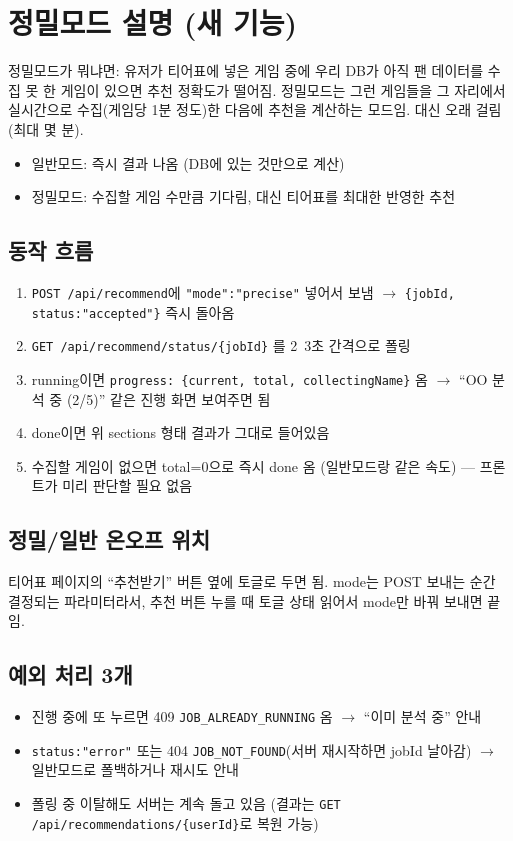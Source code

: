 \documentclass[11pt]{article}
\begin{document}
\section*{정밀모드 설명 (새 기능)}

정밀모드가 뭐냐면: 유저가 티어표에 넣은 게임 중에 우리 DB가 아직 팬 데이터를
수집 못 한 게임이 있으면 추천 정확도가 떨어짐. 정밀모드는 그런 게임들을
그 자리에서 실시간으로 수집(게임당 1분 정도)한 다음에 추천을 계산하는 모드임.
대신 오래 걸림 (최대 몇 분).

\begin{itemize}
  \item 일반모드: 즉시 결과 나옴 (DB에 있는 것만으로 계산)
  \item 정밀모드: 수집할 게임 수만큼 기다림, 대신 티어표를 최대한 반영한 추천
\end{itemize}

\subsection*{동작 흐름}
\begin{enumerate}
  \item \texttt{POST /api/recommend}에 \texttt{"mode":"precise"} 넣어서 보냄
        $\to$ \texttt{\{jobId, status:"accepted"\}} 즉시 돌아옴
  \item \texttt{GET /api/recommend/status/\{jobId\}} 를 2~3초 간격으로 폴링
  \item running이면 \texttt{progress: \{current, total, collectingName\}} 옴
        $\to$ ``OO 분석 중 (2/5)'' 같은 진행 화면 보여주면 됨
  \item done이면 위 sections 형태 결과가 그대로 들어있음
  \item 수집할 게임이 없으면 total=0으로 즉시 done 옴 (일반모드랑 같은 속도)
        --- 프론트가 미리 판단할 필요 없음
\end{enumerate}

\subsection*{정밀/일반 온오프 위치}
티어표 페이지의 ``추천받기'' 버튼 옆에 토글로 두면 됨. mode는 POST 보내는 순간
결정되는 파라미터라서, 추천 버튼 누를 때 토글 상태 읽어서 mode만 바꿔 보내면 끝임.

\subsection*{예외 처리 3개}
\begin{itemize}
  \item 진행 중에 또 누르면 409 \texttt{JOB\_ALREADY\_RUNNING} 옴 $\to$ ``이미 분석 중'' 안내
  \item \texttt{status:"error"} 또는 404 \texttt{JOB\_NOT\_FOUND}(서버 재시작하면
        jobId 날아감) $\to$ 일반모드로 폴백하거나 재시도 안내
  \item 폴링 중 이탈해도 서버는 계속 돌고 있음
        (결과는 \texttt{GET /api/recommendations/\{userId\}}로 복원 가능)
\end{itemize}
\end{document}
